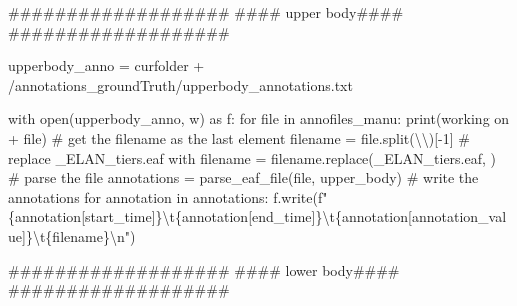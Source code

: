 \documentclass[
  letterpaper,
  DIV=11,
  numbers=noendperiod]{scrreprt}
\newenvironment{Shaded}{\begin{snugshade}}{\end{snugshade}}
\newcommand{\BuiltInTok}[1]{\textcolor[rgb]{0.00,0.23,0.31}{#1}}
\newcommand{\CharTok}[1]{\textcolor[rgb]{0.13,0.47,0.30}{#1}}
\newcommand{\CommentTok}[1]{\textcolor[rgb]{0.37,0.37,0.37}{#1}}
\newcommand{\ControlFlowTok}[1]{\textcolor[rgb]{0.00,0.23,0.31}{#1}}
\newcommand{\DecValTok}[1]{\textcolor[rgb]{0.68,0.00,0.00}{#1}}
\newcommand{\ImportTok}[1]{\textcolor[rgb]{0.00,0.46,0.62}{#1}}
\newcommand{\KeywordTok}[1]{\textcolor[rgb]{0.00,0.23,0.31}{#1}}
\newcommand{\NormalTok}[1]{\textcolor[rgb]{0.00,0.23,0.31}{#1}}
\newcommand{\OperatorTok}[1]{\textcolor[rgb]{0.37,0.37,0.37}{#1}}
\newcommand{\SpecialCharTok}[1]{\textcolor[rgb]{0.37,0.37,0.37}{#1}}
\newcommand{\SpecialStringTok}[1]{\textcolor[rgb]{0.13,0.47,0.30}{#1}}
\newcommand{\StringTok}[1]{\textcolor[rgb]{0.13,0.47,0.30}{#1}}
\begin{document}
\begin{Shaded}
\begin{Highlighting}[]
\CommentTok{\#\#\#\#\#\#\#\#\#\#\#\#\#\#\#\#\#\#\#}
\CommentTok{\#\#\#\# upper body\#\#\#\#}
\CommentTok{\#\#\#\#\#\#\#\#\#\#\#\#\#\#\#\#\#\#\#}

\NormalTok{upperbody\_anno }\OperatorTok{=}\NormalTok{ curfolder }\OperatorTok{+} \StringTok{\textquotesingle{}/annotations\_groundTruth/upperbody\_annotations.txt\textquotesingle{}}

\ControlFlowTok{with} \BuiltInTok{open}\NormalTok{(upperbody\_anno, }\StringTok{\textquotesingle{}w\textquotesingle{}}\NormalTok{) }\ImportTok{as}\NormalTok{ f:}
    \ControlFlowTok{for} \BuiltInTok{file} \KeywordTok{in}\NormalTok{ annofiles\_manu:}
        \BuiltInTok{print}\NormalTok{(}\StringTok{\textquotesingle{}working on \textquotesingle{}} \OperatorTok{+} \BuiltInTok{file}\NormalTok{)}
        \CommentTok{\# get the filename as the last element}
\NormalTok{        filename }\OperatorTok{=} \BuiltInTok{file}\NormalTok{.split(}\StringTok{\textquotesingle{}}\CharTok{\textbackslash{}\textbackslash{}}\StringTok{\textquotesingle{}}\NormalTok{)[}\OperatorTok{{-}}\DecValTok{1}\NormalTok{]}
        \CommentTok{\# replace \_ELAN\_tiers.eaf with \textquotesingle{}\textquotesingle{}}
\NormalTok{        filename }\OperatorTok{=}\NormalTok{ filename.replace(}\StringTok{\textquotesingle{}\_ELAN\_tiers.eaf\textquotesingle{}}\NormalTok{, }\StringTok{\textquotesingle{}\textquotesingle{}}\NormalTok{)}
        \CommentTok{\# parse the file}
\NormalTok{        annotations }\OperatorTok{=}\NormalTok{ parse\_eaf\_file(}\BuiltInTok{file}\NormalTok{, }\StringTok{\textquotesingle{}upper\_body\textquotesingle{}}\NormalTok{)}
        \CommentTok{\# write the annotations}
        \ControlFlowTok{for}\NormalTok{ annotation }\KeywordTok{in}\NormalTok{ annotations:}
\NormalTok{            f.write(}\SpecialStringTok{f"}\SpecialCharTok{\{}\NormalTok{annotation[}\StringTok{\textquotesingle{}start\_time\textquotesingle{}}\NormalTok{]}\SpecialCharTok{\}}\CharTok{\textbackslash{}t}\SpecialCharTok{\{}\NormalTok{annotation[}\StringTok{\textquotesingle{}end\_time\textquotesingle{}}\NormalTok{]}\SpecialCharTok{\}}\CharTok{\textbackslash{}t}\SpecialCharTok{\{}\NormalTok{annotation[}\StringTok{\textquotesingle{}annotation\_value\textquotesingle{}}\NormalTok{]}\SpecialCharTok{\}}\CharTok{\textbackslash{}t}\SpecialCharTok{\{}\NormalTok{filename}\SpecialCharTok{\}}\CharTok{\textbackslash{}n}\SpecialStringTok{"}\NormalTok{)}

\CommentTok{\#\#\#\#\#\#\#\#\#\#\#\#\#\#\#\#\#\#\#}
\CommentTok{\#\#\#\# lower body\#\#\#\#}
\CommentTok{\#\#\#\#\#\#\#\#\#\#\#\#\#\#\#\#\#\#\#}


\end{Highlighting}
\end{Shaded}
\end{document}

